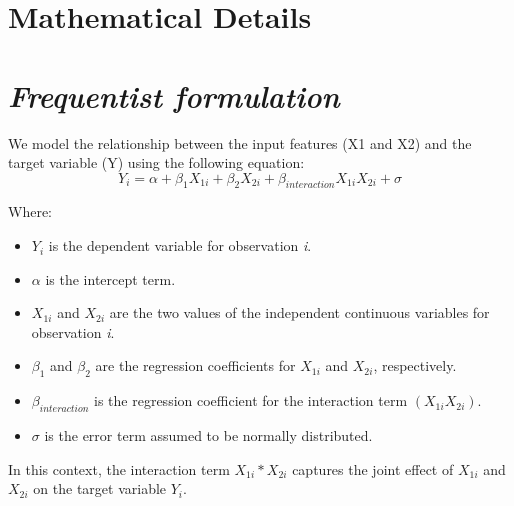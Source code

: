 \documentclass[
  letterpaper,
  DIV=11,
  numbers=noendperiod]{scrreprt}
\newenvironment{Shaded}{\begin{snugshade}}{\end{snugshade}}
\newcommand{\CommentTok}[1]{\textcolor[rgb]{0.37,0.37,0.37}{#1}}
\newcommand{\FloatTok}[1]{\textcolor[rgb]{0.68,0.00,0.00}{#1}}
\newcommand{\FunctionTok}[1]{\textcolor[rgb]{0.28,0.35,0.67}{#1}}
\newcommand{\NormalTok}[1]{\textcolor[rgb]{0.00,0.23,0.31}{#1}}
\newcommand{\SpecialCharTok}[1]{\textcolor[rgb]{0.37,0.37,0.37}{#1}}
\begin{document}
\begin{Shaded}
\end{Shaded}

\section{Mathematical Details}\label{mathematical-details-2}

\section{\texorpdfstring{\emph{Frequentist
formulation}}{Frequentist formulation}}\label{frequentist-formulation-2}

We model the relationship between the input features (X1 and X2) and the
target variable (Y) using the following equation: \[
𝑌_i = \alpha + \beta_1𝑋_{1i} + \beta_2𝑋_{2i} + \beta_{interaction}𝑋_{1i}𝑋_{2i} + \sigma
\]

Where:

\begin{itemize}
\item
  \(Y_i\) is the dependent variable for observation \emph{i}.
\item
  \(\alpha\) is the intercept term.
\item
  \(X_{1i}\) and \(X_{2i}\) are the two values of the independent
  continuous variables for observation \emph{i}.
\item
  \(\beta_1\) and \(\beta_2\) are the regression coefficients for
  \(X_{1i}\) and \(X_{2i}\), respectively.
\item
  \(\beta_{interaction}\) is the regression coefficient for the
  interaction term \((X_{1i}  X_{2i})\).
\item
  \(\sigma\) is the error term assumed to be normally distributed.
\end{itemize}

In this context, the interaction term \(X_{1i} * X_{2i}\) captures the
joint effect of \(X_{1i}\) and \(X_{2i}\) on the target variable
\(Y_i\).
\end{document}

